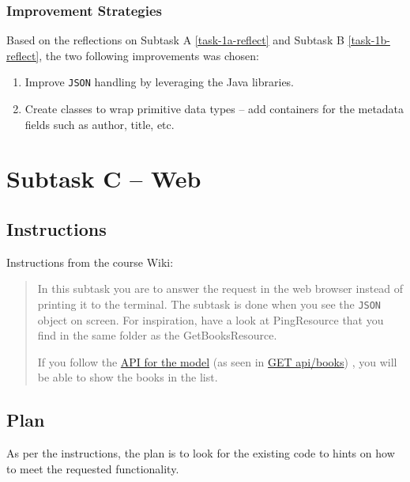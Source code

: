 \subsubsection{Improvement Strategies}
Based on the reflections on Subtask A \ref{task-1a-reflect} and Subtask B
\ref{task-1b-reflect}, the two following improvements was chosen:

\begin{enumerate}
  \item Improve \texttt{JSON} handling by leveraging the Java libraries.
  \item Create classes to wrap primitive data types -- add containers for the
        metadata fields such as author, title, etc.
\end{enumerate}



\section{Subtask C -- Web}\label{subtask-c-web}
\subsection{Instructions}\label{task-1-instructions}
Instructions from the course Wiki\cite{1dv600:lab1:instructions}:

\begin{quote}
  In this subtask you are to answer the request in the web browser instead of
  printing it to the terminal. The subtask is done when you see the \texttt{JSON} object
  on screen. For inspiration, have a look at PingResource that you find in the
  same folder as the GetBooksResource.

  If you follow the
  \href{https://htmlpreview.github.io/?https://github.com/tobias-dv-lnu/1dv600-lab/blob/master/api-specification/api-specification.html}{API for the model}
  (as seen in
  \href{https://htmlpreview.github.io/?https://github.com/tobias-dv-lnu/1dv600-lab/blob/master/api-specification/api-specification.html\#books-get}{GET api/books})
  , you will be able to show the books in the list.
\end{quote}


\subsection{Plan}\label{task-1c-plan}
As per the instructions, the plan is to look for the existing code to hints
on how to meet the requested functionality.

